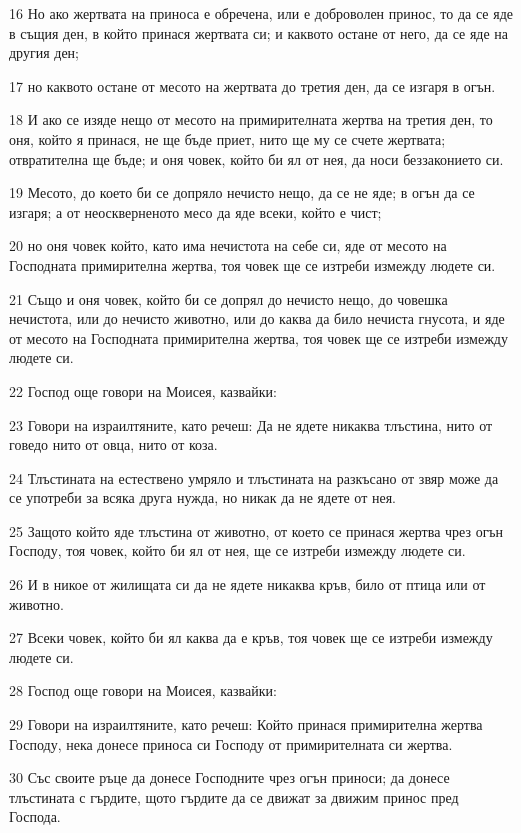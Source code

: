 \par 16 Но ако жертвата на приноса е обречена, или е доброволен принос, то да се яде в същия ден, в който принася жертвата си; и каквото остане от него, да се яде на другия ден;
\par 17 но каквото остане от месото на жертвата до третия ден, да се изгаря в огън.
\par 18 И ако се изяде нещо от месото на примирителната жертва на третия ден, то оня, който я принася, не ще бъде приет, нито ще му се счете жертвата; отвратителна ще бъде; и оня човек, който би ял от нея, да носи беззаконието си.
\par 19 Месото, до което би се допряло нечисто нещо, да се не яде; в огън да се изгаря; а от неоскверненото месо да яде всеки, който е чист;
\par 20 но оня човек който, като има нечистота на себе си, яде от месото на Господната примирителна жертва, тоя човек ще се изтреби измежду людете си.
\par 21 Също и оня човек, който би се допрял до нечисто нещо, до човешка нечистота, или до нечисто животно, или до каква да било нечиста гнусота, и яде от месото на Господната примирителна жертва, тоя човек ще се изтреби измежду людете си.
\par 22 Господ още говори на Моисея, казвайки:
\par 23 Говори на израилтяните, като речеш: Да не ядете никаква тлъстина, нито от говедо нито от овца, нито от коза.
\par 24 Тлъстината на естествено умряло и тлъстината на разкъсано от звяр може да се употреби за всяка друга нужда, но никак да не ядете от нея.
\par 25 Защото който яде тлъстина от животно, от което се принася жертва чрез огън Господу, тоя човек, който би ял от нея, ще се изтреби измежду людете си.
\par 26 И в никое от жилищата си да не ядете никаква кръв, било от птица или от животно.
\par 27 Всеки човек, който би ял каква да е кръв, тоя човек ще се изтреби измежду людете си.
\par 28 Господ още говори на Моисея, казвайки:
\par 29 Говори на израилтяните, като речеш: Който принася примирителна жертва Господу, нека донесе приноса си Господу от примирителната си жертва.
\par 30 Със своите ръце да донесе Господните чрез огън приноси; да донесе тлъстината с гърдите, щото гърдите да се движат за движим принос пред Господа.
